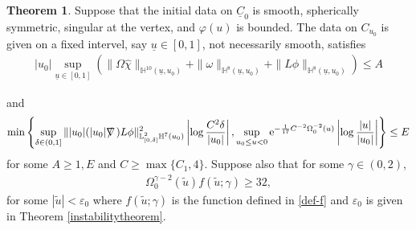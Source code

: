 \documentclass[11pt,reqno]{amsart}
\theoremstyle{definition}
\newtheorem{theorem}{Theorem}[section]
\numberwithin{equation}{section}
\newcommand{\tr}{\mathrm{tr}}
\renewcommand{\L}{\mathbb{L}}
\renewcommand{\H}{\mathbb{H}}
\def\chib{\underline{\chi}}
\def\chih{\widehat{\chi}}
\def\etab{\underline{\eta}}
\def\tr{\mathrm{tr}}
\def\ub{\underline{u}}
\def\Cb{\underline{C}}
\newcommand{\tu}{\widetilde{u}}
\def\nablas{\mbox{$\nabla \mkern -13mu /$ }}
\begin{document}
\begin{theorem}\label{instabilitytheoremweak}
Suppose that the initial data on $\Cb_0$ is smooth, spherically symmetric, singular at the vertex, and  $\varphi(u)$ is bounded. The data on $C_{u_0}$ is given on a fixed intervel, say $\ub\in[0,1]$, not necessarily smooth, satisfies
\begin{equation}\label{condition-A-generic}
\begin{split}
|u_0|\sup_{\ub\in[0,1]}\left(\|\Omega\chih\|_{\H^{10}(\ub,u_0)}+\|\omega\|_{\H^8(\ub,u_0)}+\|L\phi\|_{\H^8(\ub,u_0)}\right)\le A
\end{split}
\end{equation}
\begin{comment}
\begin{equation}\label{condition-A-generic}
\begin{split}
&\sum_{\xi\in\{\chih,\nablas\tr\chib,\etab,\omega,L\phi,\nablas\phi\}}\|\xi\|_{L^\infty_{\ub\in[0,1]}H^4(u_0)}\\
&+\sup_{\delta\in(0,1]}\frac{1}{\delta^{\frac{1}{2}}}\sum_{\xi\in\{\etab,L\phi,\nablas\phi\}}\|\xi\|_{L^2_{\ub\in[0,\delta]}H^5(u_0)}\\
&+\sup_{\delta\in(0,1]}\frac{1}{\delta^{\frac{1}{2}}}\sum_{\Xi\in\{\beta,K-|u_0|^{-2},\sigma\}}\|\Xi\|_{L^2_{\ub\in[0,\delta]}H^4(u_0)}\le A<+\infty.
\end{split}
\end{equation}
\end{comment}
and
\begin{equation}\label{condition-E-generic}
\begin{split}
\min\left\{\sup_{\delta\in(0,1]}\||u_0|(|u_0|\nablas)L\phi\|^2_{\L^2_{[0,\delta]}\H^7(u_0)}\left|\log\frac{C^2\delta}{|u_0|}\right|,\sup_{u_0\le u<0}\mathrm{e}^{-\frac{1}{17}C^{-2}\Omega_0^{-2}(u)}\left|\log\frac{|u|}{|u_0|}\right|\right\}\le E 
\end{split}
\end{equation}
for some $A\ge 1, E$ and $C\ge\max\{C_1,4\}$. Suppose also that for some $\gamma\in(0,2)$,
\begin{align}\label{instabilitycondition-generic}
\Omega_0^{\gamma-2}(\widetilde{u})f(\tu;\gamma)\ge32,
\end{align}
for some $|\tu|<\varepsilon_0$ where $f(\tu;\gamma)$ is the function defined in \eqref{def-f} and $\varepsilon_0$ is given in Theorem \ref{instabilitytheorem}.


\end{theorem}
\end{document}
